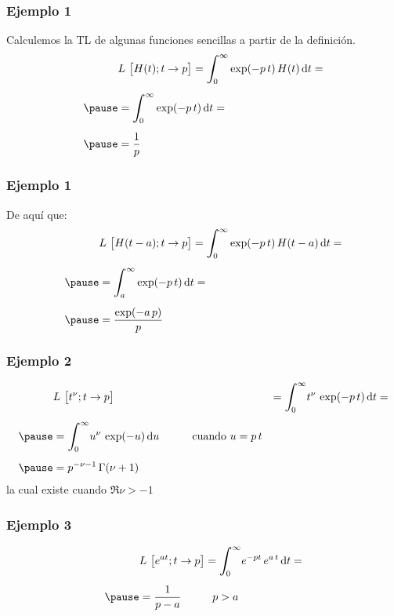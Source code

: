 \begin{frame}
\frametitle{Ejemplo 1}
Calculemos la TL de algunas funciones sencillas a partir de la definición.
\pause
\begin{eqnarray*}
\begin{aligned}
&L \big [H (t); t \to p  \big] = \scaleint{6ex}_{\bs 0}^{\infty} \exp(- p \, t) \, H (t) \dd{t} = \\[0.5em] \pause
&= \scaleint{6ex}_{\bs 0}^{\infty} \exp(- p \, t) \dd{t} = \\[0.5em] \pause
&= \dfrac{1}{p}
\end{aligned}
\end{eqnarray*}
\end{frame}
\begin{frame}
\frametitle{Ejemplo 1}
De aquí que:
\pause
\begin{eqnarray*}
\begin{aligned}
&L \big[  H(t - a); t \to p  \big] = \scaleint{6ex}_{\bs 0}^{\infty} \exp(- p \, t) \, H (t - a) \dd{t} = \\[0.5em] \pause
&= \scaleint{6ex}_{\bs a}^{\infty} \exp(- p \, t) \dd{t} = \\[0.5em] \pause
&= \dfrac{\exp(-a \, p)}{p}
\end{aligned}
\end{eqnarray*}
\end{frame}
\begin{frame}
\frametitle{Ejemplo 2}
\begin{eqnarray*}
\begin{aligned}
&L \big[  t^{\nu}; t \to p  \big] &= \scaleint{6ex}_{\bs 0}^{\infty} t^{\nu} \, \exp(- p \, t) \dd{t} = \\[0.5em] \pause
&= \scaleint{6ex}_{\bs 0}^{\infty} u^{\nu} \, \exp(-u) \dd{u} \hspace{1cm} \mbox{cuando  } u = p \, t \\[0.5em] \pause
&= p^{-\nu - 1} \, \Gamma (\nu + 1)
\end{aligned}
\end{eqnarray*}
\pause
la cual existe cuando $\Re{\nu} > - 1$
\end{frame}
\begin{frame}
\frametitle{Ejemplo 3}
\begin{eqnarray*}
\begin{aligned}
&L \big[  e^{a t}; t \to p  \big] = \scaleint{6ex}_{\bs 0}^{\infty} e^{-p t} \, e^{a \, t} \dd{t} = \\[0.5em] \pause
&= \dfrac{1}{p - a} \hspace{1cm} p > a
\end{aligned}
\end{eqnarray*}
\end{frame}

